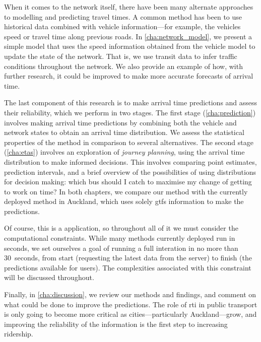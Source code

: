 When it comes to the network itself, there have been many alternate approaches to modelling and predicting travel times. A common method has been to use historical data combined with \rt{} vehicle information---for example, the vehicles speed or travel time along previous roads. In \cref{cha:network_model}, we present a simple \rt{} model that uses the \rt{} speed information obtained from the vehicle model to update the state of the network. That is, we use \rt{} transit data to infer \rt{} traffic conditions throughout the network. We also provide an example of how, with further research, it could be improved to make more accurate forecasts of arrival time.


The last component of this research is to make arrival time predictions and assess their reliability, which we perform in two stages. The first stage (\cref{cha:prediction}) involves making arrival time predictions by combining both the vehicle and network states to obtain an arrival time distribution. We assess the statistical properties of the method in comparison to several alternatives. The second stage (\cref{cha:etas}) involves an exploration of \emph{journey planning}, using the arrival time distribution to make informed decisions. This involves comparing point estimates, prediction intervals, and a brief overview of the possibilities of using distributions for decision making: which bus should I catch to maximise my change of getting to work on time? In both chapters, we compare our method with the currently deployed method in Auckland, which uses solely \gls{gtfs} information to make the predictions.


Of course, this is a \rt{} application, so throughout all of it we must consider the computational constraints. While many methods currently deployed run in seconds, we set ourselves a goal of running a full interation in no more than 30~seconds, from start (requesting the latest data from the server) to finish (the predictions available for users). The complexities associated with this constraint will be discussed throughout.


Finally, in \cref{cha:discussion}, we review our methods and findings, and comment on what could be done to improve the predictions. The role of \gls{rti} in public transport is only going to become more critical as cities---particularly Auckland---grow, and improving the reliability of the information is the first step to increasing ridership.
